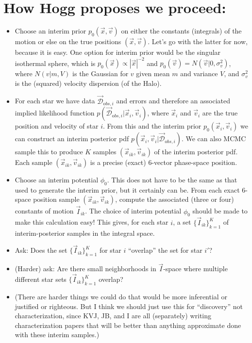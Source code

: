 \documentclass[12pt,a4paper,twoside]{article}
\newcommand{\vx}{\vec{x}}
\newcommand{\vv}{\vec{v}}
\newcommand{\vI}{\vec{I}}
\newcommand{\vxi}{\vec{x}_i}
\newcommand{\vvi}{\vec{v}_i}
\newcommand{\vxik}{\vec{x}_{ik}}
\newcommand{\vvik}{\vec{v}_{ik}}
\newcommand{\vIik}{\vec{I}_{ik}}
\newcommand{\vIikset}{\{\vIik\}_{k=1}^K}
\newcommand{\dobsi}{\vec{\mathcal D}_{{\mathrm obs},i}}
\begin{document}
\section{How Hogg proposes we proceed:}
\begin{itemize}
\item Choose an interim prior $p_0(\vx, \vv)$ on either the constants
  (integrals) of the motion or else on the true positions $(\vx,
  \vv)$.
  Let's go with the latter for now, because it is easy.
  One option for interim prior would be the singular isothermal sphere,
  which is $p_0(\vx)\propto |\vx|^{-2}$ and $p_0(\vv)=N(\vv|0,\sigma_v^2)$,
  where $N(v|m,V)$ is the Gaussian for $v$ given mean $m$ and variance $V$,
  and $\sigma_v^2$ is the (squared) velocity dispersion (of the Halo).

\item For each star we have data $\dobsi$ and errors
  and therefore an associated implied likelihood function $p(\dobsi|\vxi,\vvi)$,
  where $\vxi$ and $\vvi$ are the true position and velocity of star $i$.
  From this and the interim prior $p_0(\vxi,\vvi)$ we can construct an
  interim posterior pdf $p(\vxi,\vvi|\dobsi)$.
  We can also MCMC sample this to produce $K$ samples $(\vxik,\vvik)$
  of the interim posterior pdf.
  Each sample $(\vxik,\vvik)$ is a precise (exact) 6-vector phase-space position.

\item Choose an interim potential $\phi_0$.
  This does not have to be the same as that used to generate the interim prior, but it certainly can be.
  From each exact 6-space position sample $(\vxik,\vvik)$,
  compute the associated (three or four) constants of motion $\vIik$.
  The choice of interim potential $\phi_0$ should be made to make this calculation easy!
  This gives, for each star $i$, a set $\vIikset$ of interim-posterior samples in the integral space.

\item Ask:
  Does the set $\vIikset$ for star $i$ ``overlap'' the set for star $i'$?

\item (Harder) ask:
  Are there small neighborhoods in $\vI$-space
  where multiple different star sets $\vIikset$ overlap?

\item (There are harder things we could do that would be more
  inferential or justified or righteous.  But I think we should just
  use this for ``discovery'' not characterization, since KVJ, JB, and
  I are all (separately) writing characterization papers that will be
  better than anything approximate done with these interim samples.)
\end{itemize}
\end{document}

